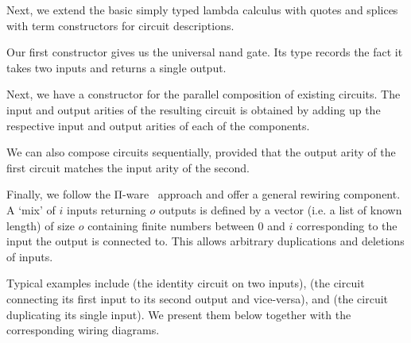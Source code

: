 \documentclass{article}
\begin{document}

Next, we extend the basic simply typed lambda calculus with
quotes and splices with term constructors for circuit descriptions.

Our first constructor gives us the universal nand gate.
Its type records the fact it takes two inputs and returns
a single output.


Next, we have a constructor for the parallel composition
of existing circuits. The input and output arities of the
resulting circuit is obtained by adding up the respective
input and output arities of each of the components.


We can also compose circuits sequentially, provided
that the output arity of the first circuit matches
the input arity of the second.


Finally, we follow the Π-ware~\cite{DBLP:conf/types/FlorSS15}
approach and offer a general rewiring component.
A `mix' of $i$ inputs returning $o$ outputs is defined by
a vector (i.e. a list of known length) of size $o$
containing finite numbers between $0$ and $i$
corresponding to the input the output is connected to.
%
This allows arbitrary duplications and deletions
of inputs.



Typical examples include
 (the identity circuit on two inputs),
 (the circuit connecting its first input to its second output and vice-versa),
and  (the circuit duplicating its single input).
We present them below together with the corresponding wiring diagrams.

\noindent
\begin{minipage}{.5\textwidth}
\end{minipage}\hfill
\begin{minipage}{.25\textwidth}
\end{minipage}
\end{document}
